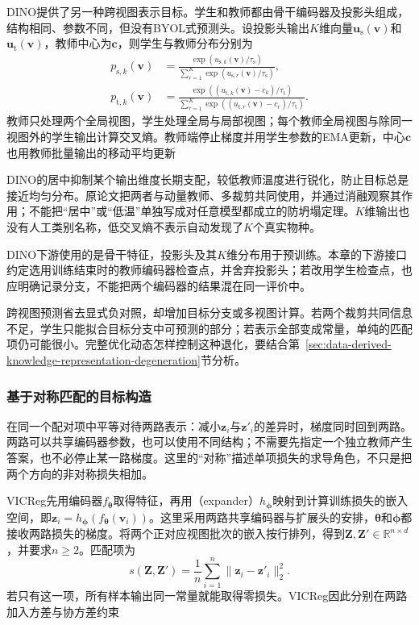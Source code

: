 DINO提供了另一种跨视图表示目标。学生和教师都由骨干编码器及投影头组成，结构相同、参数不同，但没有BYOL式预测头。设投影头输出$K$维向量$\bm{u}_{\mathrm{s}}(\bm{v})$和$\bm{u}_{\mathrm{t}}(\bm{v})$，教师中心为$\bm{c}$，则学生与教师分布分别为
\begin{align}
  p_{\mathrm{s},k}(\bm{v})
  &=\frac{\exp(u_{\mathrm{s},k}(\bm{v})/\tau_{\mathrm{s}})}
  {\sum_{r=1}^{K}\exp(u_{\mathrm{s},r}(\bm{v})/\tau_{\mathrm{s}})},\\
  p_{\mathrm{t},k}(\bm{v})
  &=\frac{\exp((u_{\mathrm{t},k}(\bm{v})-c_k)/\tau_{\mathrm{t}})}
  {\sum_{r=1}^{K}\exp((u_{\mathrm{t},r}(\bm{v})-c_r)/\tau_{\mathrm{t}})}.
  \label{eq:data-derived-knowledge-dino-distributions}
\end{align}
教师只处理两个全局视图，学生处理全局与局部视图；每个教师全局视图与除同一视图外的学生输出计算交叉熵。教师端停止梯度并用学生参数的EMA更新，中心$\bm{c}$也用教师批量输出的移动平均更新

DINO的居中抑制某个输出维度长期支配，较低教师温度进行锐化，防止目标总是接近均匀分布。原论文把两者与动量教师、多裁剪共同使用，并通过消融观察其作用；不能把“居中”或“低温”单独写成对任意模型都成立的防坍塌定理。$K$维输出也没有人工类别名称，低交叉熵不表示自动发现了$K$个真实物种。

DINO下游使用的是骨干特征，投影头及其$K$维分布用于预训练。本章的下游接口约定选用训练结束时的教师编码器检查点，并舍弃投影头；若改用学生检查点，也应明确记录分支，不能把两个编码器的结果混在同一评价中。

跨视图预测省去显式负对照，却增加目标分支或多视图计算。若两个裁剪共同信息不足，学生只能拟合目标分支中可预测的部分；若表示全部变成常量，单纯的匹配项仍可能很小。完整优化动态怎样控制这种退化，要结合第~\ref{sec:data-derived-knowledge-representation-degeneration}节分析。

\subsubsection{基于对称匹配的目标构造}
\label{sec:data-derived-knowledge-symmetric-matching}

在同一个配对项中平等对待两路表示：减小$\bm{z}_i$与$\bm{z}'_i$的差异时，梯度同时回到两路。两路可以共享编码器参数，也可以使用不同结构；不需要先指定一个独立教师产生答案，也不必停止某一路梯度。这里的“对称”描述单项损失的求导角色，不只是把两个方向的非对称损失相加。

VICReg先用编码器$f_{\bm{\theta}}$取得特征，再用（expander）$h_{\bm{\phi}}$映射到计算训练损失的嵌入空间，即$\bm{z}_i=h_{\bm{\phi}}(f_{\bm{\theta}}(\bm{v}_i))$。这里采用两路共享编码器与扩展头的安排，$\bm{\theta}$和$\bm{\phi}$都接收两路损失的梯度。将两个正对应视图批次的嵌入按行排列，得到$\bm{Z},\bm{Z}'\in\mathbb{R}^{n\times d}$，并要求$n\geq2$。匹配项为
\begin{equation}
  s(\bm{Z},\bm{Z}')
  =\frac{1}{n}\sum_{i=1}^{n}\lVert\bm{z}_i-\bm{z}'_i\rVert_2^2.
  \label{eq:data-derived-knowledge-vicreg-invariance}
\end{equation}
若只有这一项，所有样本输出同一常量就能取得零损失。VICReg因此分别在两路加入方差与协方差约束

